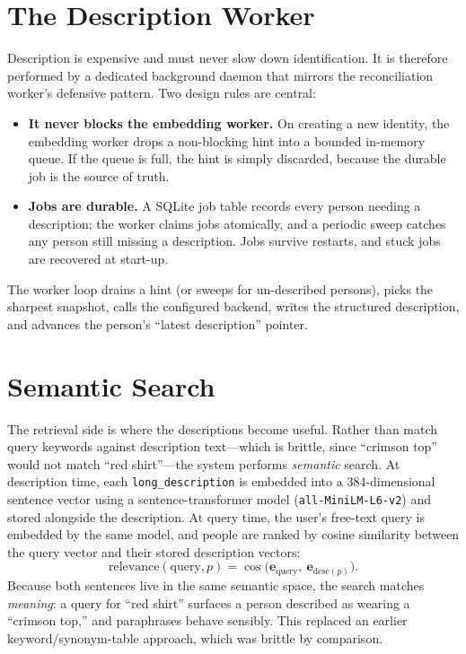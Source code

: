 \documentclass[12pt]{report}
\begin{document}
\section{The Description Worker}
Description is expensive and must never slow down identification. It is therefore performed by a dedicated background daemon that mirrors the reconciliation worker's defensive pattern. Two design rules are central:
\begin{itemize}
    \item \textbf{It never blocks the embedding worker.} On creating a new identity, the embedding worker drops a non-blocking hint into a bounded in-memory queue. If the queue is full, the hint is simply discarded, because the durable job is the source of truth.
    \item \textbf{Jobs are durable.} A SQLite job table records every person needing a description; the worker claims jobs atomically, and a periodic sweep catches any person still missing a description. Jobs survive restarts, and stuck jobs are recovered at start-up.
\end{itemize}
The worker loop drains a hint (or sweeps for un-described persons), picks the sharpest snapshot, calls the configured backend, writes the structured description, and advances the person's ``latest description'' pointer.

\section{Semantic Search}
The retrieval side is where the descriptions become useful. Rather than match query keywords against description text---which is brittle, since ``crimson top'' would not match ``red shirt''---the system performs \emph{semantic} search. At description time, each \texttt{long\_description} is embedded into a 384-dimensional sentence vector using a sentence-transformer model (\texttt{all-MiniLM-L6-v2}) and stored alongside the description. At query time, the user's free-text query is embedded by the same model, and people are ranked by cosine similarity between the query vector and their stored description vectors:
\[
\text{relevance}(\text{query}, p) = \cos\!\big( \mathbf{e}_{\text{query}},\ \mathbf{e}_{\text{desc}(p)} \big).
\]
Because both sentences live in the same semantic space, the search matches \emph{meaning}: a query for ``red shirt'' surfaces a person described as wearing a ``crimson top,'' and paraphrases behave sensibly. This replaced an earlier keyword/synonym-table approach, which was brittle by comparison.
\end{document}
